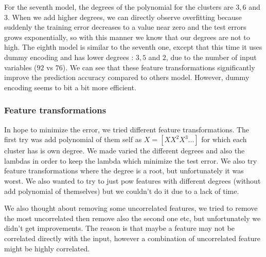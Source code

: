 \documentclass{article} %
\begin{document}
For the seventh model, the degrees of the polynomial for the clusters are $3,6$ and $3$. When we add higher degrees, we can directly observe overfitting because suddenly the training error decreases to a value near zero and the test errors grows exponentially, so with this manner we know that our degrees are not to high. The eighth model is similar to the seventh one, except that this time it uses dummy encoding and has lower degrees : $3,5$ and $2$, due to the number of input variables ($92$ vs $76$). We can see that these feature transformations significantly improve the prediction accuracy compared to others model. However, dummy encoding seems to bit a bit more efficient.

\subsubsection{Feature transformations}

In hope to minimize the error, we tried different feature transformations. The first try was add polynomial of them self as $X = [X X^2 X^3 ...]$ for which each cluster has is own degree. We made varied the different degrees and also the lambdas in order to keep the lambda which minimize the test error. We also try feature transformations where the degree is a root, but unfortunately it was worst. We also wanted to try to just pow features with different degrees (without add polynomial of themselves) but we couldn't do it due to a lack of time.

We also thought about removing some uncorrelated features, we tried to remove the most uncorrelated then remove also the second one etc, but unfortunately we didn't get improvements. The reason is that maybe a feature may not be correlated directly with the input, however a combination of uncorrelated feature might be highly correlated.
\end{document}
